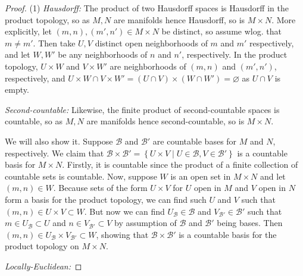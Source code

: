 \documentclass[reqno]{amsart}
\theoremstyle{definition}
\theoremstyle{remark}
\begin{document}
\begin{proof}
    (1) \textit{Hausdorff:} The product of two Hausdorff spaces
    is Hausdorff in the product topology, so
    as $M,N$ are manifolds hence Hausdorff, so is
    $M \times N$.
    More explicitly, let $\left( m,n \right) ,
    \left( m',n' \right) \in M \times N$ be distinct, so
    assume wlog. that $m \neq m'$. Then
    take $U, V$ distinct open neighborhoods of
    $m$ and $m'$ respectively, and let $W, W'$ be any neighborhoods
    of $n$ and $n'$, respectively. In the product topology,
    $U \times W$ and $V \times W'$ are neighborhoods of
    $\left( m,n \right) $ and $\left( m',n' \right) $, respectively,
    and $U \times W \cap V \times W' =
    \left( U \cap V \right) \times \left( W \cap W' \right) 
    = \varnothing$ as $U \cap V$ is empty.\\
    \linebreak

    \textit{Second-countable:} 
    Likewise, the finite product of
    second-countable spaces is countable, so
    as $M,N$ are manifolds hence second-countable, so
    is $M \times N$.

    We will also show it. Suppose
    $\mathcal{B}$ and $\mathcal{B}'$ are countable
    bases for $M$ and $N$, respectively. 
    We claim that
    $\mathcal{B} \times \mathcal{B}'
    = \left\{ U \times V \mid 
    U \in \mathcal{B}, V \in \mathcal{B}'\right\} $ is
    a countable basis for
    $M \times N$. Firstly, it
    is countable since the product of a finite collection
    of countable sets is countable. Now,
    suppose $W$ is an open set in
    $M \times N$ and let
    $\left( m,n \right)  \in W$. Because sets of the form
    $U \times V$ for $U$ open in $M$ and $V$ open in
    $N$ form a basis for the product topology, we
    can find such $U$ and $V$ such that
    $\left( m,n \right) \in U \times V
    \subset W$. But now we can find
    $U_{\mathcal{B}} \in \mathcal{B}$ and
    $V_{\mathcal{B}'} \in \mathcal{B}'$ such that
    $m \in U_{\mathcal{B}} \subset U$ and
    $n \in V_{\mathcal{B}'} \subset V$ by assumption of
    $\mathcal{B}$ and $\mathcal{B}'$ being bases. 
    Then
    $\left( m,n \right) \in 
    U_{\mathcal{B}} \times V_{\mathcal{B}'}
    \subset W$, showing that
    $\mathcal{B} \times \mathcal{B}'$ is a countable basis for
    the product topology on $M \times N$.\\
    \linebreak
    
    
    
    \textit{Locally-Euclidean:}


\end{proof}
\end{document}
